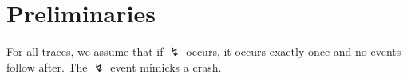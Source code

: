 \documentclass[12pt]{article}
\begin{document}
\section{Preliminaries}

For all traces, we assume that if $\lightning$ occurs, it occurs exactly once and no events follow after.
The $\lightning$ event mimicks a crash.

\end{document}

